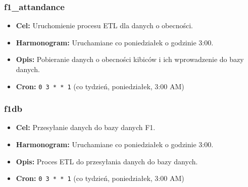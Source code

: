 \documentclass[12pt]{article}
\begin{document}
\subsubsection{f1\_attandance}
\begin{itemize}
    \item \textbf{Cel:} Uruchomienie procesu ETL dla danych o obecności.
    \item \textbf{Harmonogram:} Uruchamiane co poniedziałek o godzinie 3:00.
    \item \textbf{Opis:} Pobieranie danych o obecności kibiców i ich wprowadzenie do bazy danych.
    \item \textbf{Cron:} \texttt{0 3 * * 1} (co tydzień, poniedziałek, 3:00 AM)
\end{itemize}

\subsubsection{f1db}
\begin{itemize}
    \item \textbf{Cel:} Przesyłanie danych do bazy danych F1.
    \item \textbf{Harmonogram:} Uruchamiane co poniedziałek o godzinie 3:00.
    \item \textbf{Opis:} Proces ETL do przesyłania danych do bazy danych.
    \item \textbf{Cron:} \texttt{0 3 * * 1} (co tydzień, poniedziałek, 3:00 AM)
\end{itemize}
\end{document}
